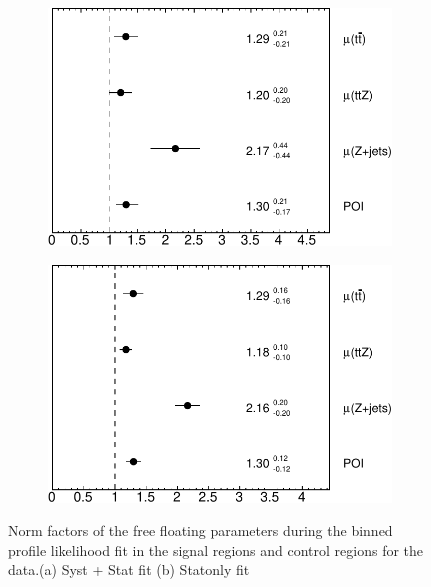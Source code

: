 \begin{figure}[!h] 
  \begin{subfigure}[b]{0.48\linewidth}
    \centering
    \includegraphics[width=\textwidth]{ubonn-thesis/Chapters/Chapters_07/Figure/Data/NormFactors-crop.pdf}
    \caption{}
    \label{fig:statsyst}
  \end{subfigure}%
  \begin{subfigure}[b]{0.48\linewidth}
    \centering
    \includegraphics[width=\textwidth]{ubonn-thesis/Chapters/Chapters_07/Figure/Data/NormFactors_statOnly-crop.pdf}
   \caption{}
   \label{fig:statonly}
  \end{subfigure}
  \caption{Norm factors of the free floating parameters during the binned profile likelihood fit in the signal regions and control regions for the data.(a) Syst + Stat fit (b) Statonly fit}
\end{figure}

